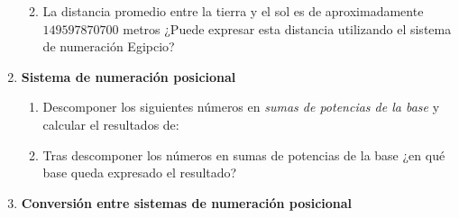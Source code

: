 \documentclass[12pt]{article}
\begin{document}
\begin{enumerate}
\begin{enumerate}

        \item La distancia promedio entre la tierra y el sol es de
            aproximadamente $149 597 870 700$ metros ¿Puede expresar esta
            distancia utilizando el sistema de numeración Egipcio?

    \end{enumerate}

    \item \textbf{Sistema de numeración posicional}

        \begin{enumerate}

            \item Descomponer los siguientes números en \emph{sumas de potencias
                de la base} y calcular el resultados de:


            \item Tras descomponer los números en sumas de potencias de la
                base ¿en qué base queda expresado el resultado?

        \end{enumerate}

    \item \textbf{Conversión entre sistemas de numeración posicional}

    \begin{enumerate}


\end{enumerate}
\end{enumerate}
\end{document}
